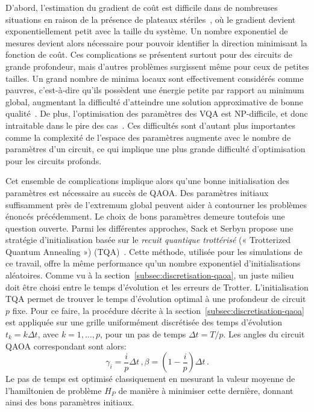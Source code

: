 D'abord, l'estimation du gradient de coût est difficile dans de nombreuses situations en raison de la présence de plateaux stériles~\cite{mccleanBarrenPlateausQuantum2018, laroccaReviewBarrenPlateaus2024}, où le gradient devient exponentiellement petit avec la taille du système. Un nombre exponentiel de mesures devient alors nécessaire pour pouvoir identifier la direction minimisant la fonction de coût. Ces complications se présentent surtout pour des circuits de grande profondeur, mais d'autres problèmes surgissent même pour ceux de petites tailles. Un grand nombre de minima locaux sont effectivement considérés comme pauvres, c'est-à-dire qu'ils possèdent une énergie petite par rapport au minimum global, augmentant la difficulté d'atteindre une solution approximative de bonne qualité~\cite{anschuetzQuantumVariationalAlgorithms2022}. De plus, l'optimisation des paramètres des VQA est \textsf{NP}-difficile, et donc intraitable dans le pire des cas~\cite{bittelTrainingVariationalQuantum2021}. Ces difficultés sont d'autant plus importantes comme la complexité de l'espace des paramètres augmente avec le nombre de paramètres d'un circuit, ce qui implique une plus grande difficulté d'optimisation pour les circuits profonds. 

Cet ensemble de complications implique alors qu'une bonne initialisation des paramètres est nécessaire au succès de QAOA. Des paramètres initiaux suffisamment près de l'extremum global peuvent aider à contourner les problèmes énoncés précédemment. Le choix de bons paramètres demeure toutefois une question ouverte. Parmi les différentes approches, Sack et Serbyn propose une stratégie d'initialisation basée sur le \textit{recuit quantique trottérisé} (« Trotterized Quantum Annealing ») (TQA)~\cite{sackQuantumAnnealingInitialization2021}. Cette méthode, utilisée pour les simulations de ce travail, offre la même performance qu'un nombre exponentiel d'initialisations aléatoires. Comme vu à la section~\ref{subsec:discretisation-qaoa}, un juste milieu doit être choisi entre le temps d'évolution et les erreurs de Trotter. L'initialisation TQA permet de trouver le temps d'évolution optimal à une profondeur de circuit $p$ fixe. Pour ce faire, la procédure décrite à la section~\ref{subsec:discretisation-qaoa} est appliquée sur une grille uniformément discrétisée des temps d'évolution $t_{k} = k \Delta t$, avec $k = 1,\dots, p$, pour un pas de temps $\Delta t = T / p$. Les angles du circuit QAOA correspondant sont alors:
\begin{equation}
    \gamma_{i} = \frac{i}{p} \Delta t \,, \beta = (1 - \frac{i}{p}) \Delta t \,.
\end{equation}
Le pas de temps est optimisé classiquement en mesurant la valeur moyenne de l'hamiltonien de problème $H_{P}$ de manière à minimiser cette dernière, donnant ainsi des bons paramètres initiaux.


